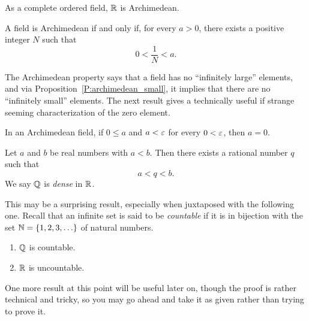 \documentclass{book}
\begin{document}
\begin{thm}
As a complete ordered field, $\mathbb{R}$ is Archimedean.
\label{T:R_archimdedean}
\end{thm}

\begin{prop}
A field is Archimedean if and only if, for every $a > 0$, there exists a positive integer $N$ such that 
\[
	0 < \frac 1 N < a.
\]
\label{P:archimedean_small}
\end{prop}

\begin{rmk}
The Archimedean property says that a field has no ``infinitely large'' elements, and via Proposition~\ref{P:archimedean_small}, it implies
that there are no ``infinitely small'' elements. The next result gives a technically useful if strange seeming characterization of the zero element.
\end{rmk}

\begin{cor}
In an Archimedean field, if $0 \leq a$ and $a < \varepsilon$ for every $0 < \varepsilon$, then $a = 0$.
\label{C:zero_small}
\end{cor}

\begin{thm}
Let $a$ and $b$ be real numbers with $a < b$. Then there exists a rational number $q$ such that
\[
	a < q < b.
\]
We say $\mathbb{Q}$ is {\em dense} in $\mathbb{R}$.
\label{T:Q_dense}
\end{thm}

\begin{rmk}
This may be a surprising result, especially when juxtaposed with the following one.
Recall that an infinite set is said to be {\em countable} if it is in bijection with the set $\mathbb{N} = \left\{ 1,2,3,\ldots \right\}$ of natural numbers. 
\end{rmk}

\begin{thm}\mbox{}
\begin{enumerate}
\item $\mathbb{Q}$ is countable.
\item $\mathbb{R}$ is uncountable. 
\end{enumerate}
\label{T:countable_uncoutable}
\end{thm}

One more result at this point will be useful later on, though the proof is rather technical and tricky, so you may 
go ahead and take it as given rather than trying to prove it.
\end{document}

